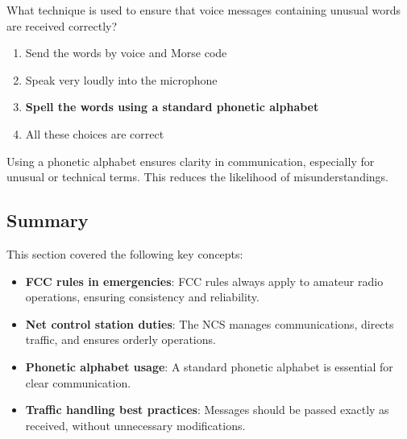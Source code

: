 \begin{tcolorbox}[colback=gray!10!white,colframe=black!75!black,title={T2C03}]
    What technique is used to ensure that voice messages containing unusual words are received correctly?
    \begin{enumerate}[label=\Alph*),noitemsep]
        \item Send the words by voice and Morse code
        \item Speak very loudly into the microphone
        \item \textbf{Spell the words using a standard phonetic alphabet}
        \item All these choices are correct
    \end{enumerate}
\end{tcolorbox}
Using a phonetic alphabet ensures clarity in communication, especially for unusual or technical terms. This reduces the likelihood of misunderstandings.


\subsection*{Summary}
This section covered the following key concepts:
\begin{itemize}
    \item \textbf{FCC rules in emergencies}: FCC rules always apply to amateur radio operations, ensuring consistency and reliability.
    \item \textbf{Net control station duties}: The NCS manages communications, directs traffic, and ensures orderly operations.
    \item \textbf{Phonetic alphabet usage}: A standard phonetic alphabet is essential for clear communication.
    \item \textbf{Traffic handling best practices}: Messages should be passed exactly as received, without unnecessary modifications.
\end{itemize}
